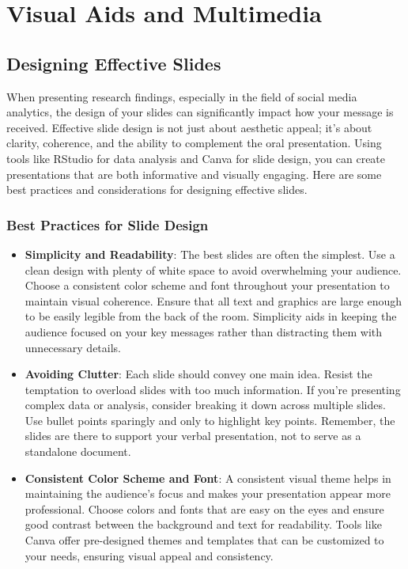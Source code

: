 \documentclass[
]{book}
\begin{document}
\hypertarget{visual-aids-and-multimedia}{%
\section*{Visual Aids and Multimedia}\label{visual-aids-and-multimedia}}

\hypertarget{designing-effective-slides}{%
\subsection*{Designing Effective Slides}\label{designing-effective-slides}}

When presenting research findings, especially in the field of social media analytics, the design of your slides can significantly impact how your message is received. Effective slide design is not just about aesthetic appeal; it's about clarity, coherence, and the ability to complement the oral presentation. Using tools like RStudio for data analysis and Canva for slide design, you can create presentations that are both informative and visually engaging. Here are some best practices and considerations for designing effective slides.

\hypertarget{best-practices-for-slide-design}{%
\subsubsection*{Best Practices for Slide Design}\label{best-practices-for-slide-design}}

\begin{itemize}
\item
  \textbf{Simplicity and Readability}: The best slides are often the simplest. Use a clean design with plenty of white space to avoid overwhelming your audience. Choose a consistent color scheme and font throughout your presentation to maintain visual coherence. Ensure that all text and graphics are large enough to be easily legible from the back of the room. Simplicity aids in keeping the audience focused on your key messages rather than distracting them with unnecessary details.
\item
  \textbf{Avoiding Clutter}: Each slide should convey one main idea. Resist the temptation to overload slides with too much information. If you're presenting complex data or analysis, consider breaking it down across multiple slides. Use bullet points sparingly and only to highlight key points. Remember, the slides are there to support your verbal presentation, not to serve as a standalone document.
\item
  \textbf{Consistent Color Scheme and Font}: A consistent visual theme helps in maintaining the audience's focus and makes your presentation appear more professional. Choose colors and fonts that are easy on the eyes and ensure good contrast between the background and text for readability. Tools like Canva offer pre-designed themes and templates that can be customized to your needs, ensuring visual appeal and consistency.
\end{itemize}
\end{document}
